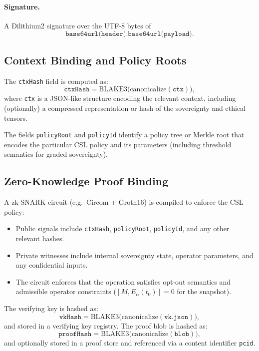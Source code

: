 \documentclass[11pt]{article}
\begin{document}
\paragraph{Signature.}
A Dilithium2 signature over the UTF-8 bytes of
\[
  \texttt{base64url(header)}.\texttt{base64url(payload)}.
\]

\subsection{Context Binding and Policy Roots}

The \texttt{ctxHash} field is computed as:
\begin{equation}
  \texttt{ctxHash} = \mathrm{BLAKE3}\bigl( \mathrm{canonicalize}(\texttt{ctx}) \bigr),
\end{equation}
where \texttt{ctx} is a JSON-like structure encoding the relevant context, including (optionally)
a compressed representation or hash of the sovereignty and ethical tensors.

The fields \texttt{policyRoot} and \texttt{policyId} identify a policy tree or Merkle root that encodes the particular CSL policy and its parameters (including threshold semantics for graded sovereignty).

\subsection{Zero-Knowledge Proof Binding}

A zk-SNARK circuit (e.g.~Circom + Groth16) is compiled to enforce the CSL policy:

\begin{itemize}[leftmargin=*]
  \item Public signals include \texttt{ctxHash}, \texttt{policyRoot}, \texttt{policyId}, and any other relevant hashes.
  \item Private witnesses include internal sovereignty state, operator parameters, and any confidential inputs.
  \item The circuit enforces that the operation satisfies opt-out semantics and admissible operator constraints ($[M,E_\alpha(t_0)]=0$ for the snapshot).
\end{itemize}

The verifying key is hashed as:
\[
  \texttt{vkHash} = \mathrm{BLAKE3}\bigl( \mathrm{canonicalize}(\texttt{vk.json}) \bigr),
\]
and stored in a verifying key registry.
The proof blob is hashed as:
\[
  \texttt{proofHash} = \mathrm{BLAKE3}\bigl( \mathrm{canonicalize}(\texttt{blob}) \bigr),
\]
and optionally stored in a proof store and referenced via a content identifier \texttt{pcid}.
\end{document}
